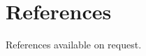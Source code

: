 \documentclass[11pt,a4paper,arial]{moderncv}        %
\begin{document}
\medskip
\section{References}
References available on request.  %



\end{document}
